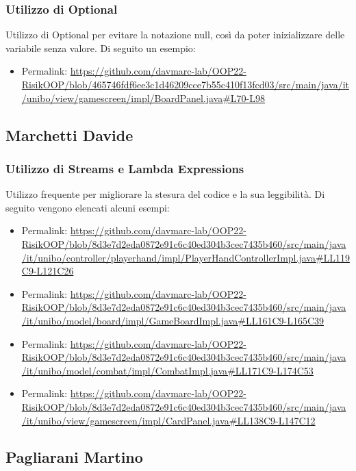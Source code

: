 \documentclass[a4paper,12pt]{report}
\begin{document}
\subsubsection*{Utilizzo di Optional}
%
Utilizzo di Optional per evitare la notazione null, cos\`i da poter inizializzare delle variabile senza valore. Di seguito un esempio:
\begin{itemize}
    \item{Permalink:} \url{https://github.com/davmarc-lab/OOP22-RisikOOP/blob/465746fdf6ee3c1d46209cce7b55c410f13fcd03/src/main/java/it/unibo/view/gamescreen/impl/BoardPanel.java#L70-L98}
\end{itemize}
%
\subsection*{Marchetti Davide}
%
\subsubsection*{Utilizzo di Streams e Lambda Expressions}
%
Utilizzo frequente per migliorare la stesura del codice e la sua leggibilit\`a. Di seguito vengono elencati alcuni esempi:
\begin{itemize}
    \item Permalink: \url{https://github.com/davmarc-lab/OOP22-RisikOOP/blob/8d3e7d2eda0872e91c6c40ed304b3cec7435b460/src/main/java/it/unibo/controller/playerhand/impl/PlayerHandControllerImpl.java#LL119C9-L121C26}
    \item Permalink: \url{https://github.com/davmarc-lab/OOP22-RisikOOP/blob/8d3e7d2eda0872e91c6c40ed304b3cec7435b460/src/main/java/it/unibo/model/board/impl/GameBoardImpl.java#LL161C9-L165C39}
    \item Permalink: \url{https://github.com/davmarc-lab/OOP22-RisikOOP/blob/8d3e7d2eda0872e91c6c40ed304b3cec7435b460/src/main/java/it/unibo/model/combat/impl/CombatImpl.java#LL171C9-L174C53}
    \item Permalink: \url{https://github.com/davmarc-lab/OOP22-RisikOOP/blob/8d3e7d2eda0872e91c6c40ed304b3cec7435b460/src/main/java/it/unibo/view/gamescreen/impl/CardPanel.java#LL138C9-L147C12}    
\end{itemize}
%
\subsection*{Pagliarani Martino}
%
\end{document}
